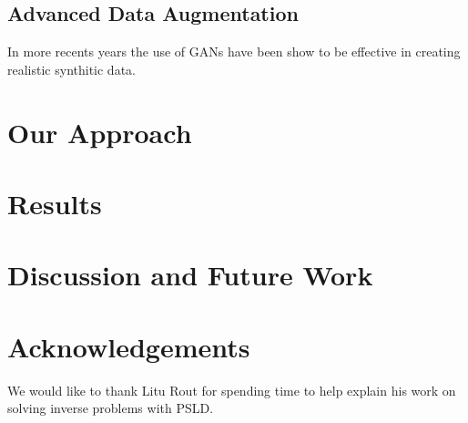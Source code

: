 \documentclass{article}
\begin{document}
\subsection{Advanced Data Augmentation}

In more recents years the use of GANs have been show to be effective in creating realistic synthitic data. 

\section{Our Approach}

\section{Results}

\section{Discussion and Future Work}

\section*{Acknowledgements}

We would like to thank Litu Rout for spending time to help explain his work on solving
inverse problems with PSLD.



\end{document}

